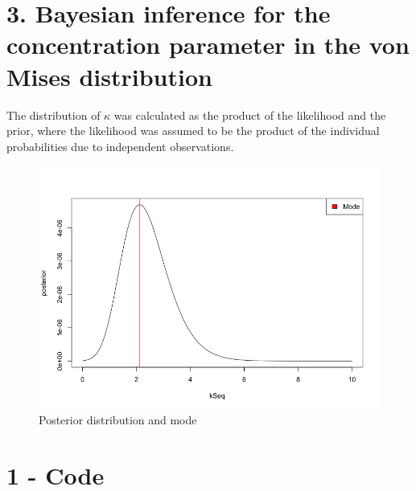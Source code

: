 \documentclass[]{article}
\begin{document}
\newpage

\section{3. Bayesian inference for the concentration parameter in the
von Mises
distribution}\label{bayesian-inference-for-the-concentration-parameter-in-the-von-mises-distribution}

The distribution of \(\kappa\) was calculated as the product of the
likelihood and the prior, where the likelihood was assumed to be the
product of the individual probabilities due to independent observations.

\begin{figure}
\centering
\includegraphics{assets/lab_1_3_ab.png}
\caption{Posterior distribution and mode}
\end{figure}

\newpage

\section{1 - Code}\label{code}
\end{document}
